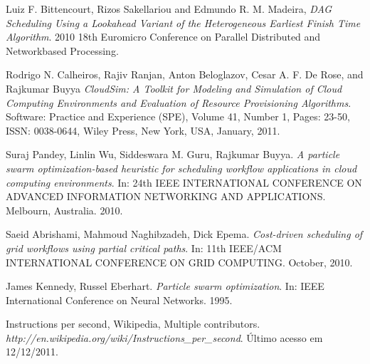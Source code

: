 \documentclass[a4paper,10pt]{article}
\begin{document}
\begin{thebibliography}{9}

  Luiz F. Bittencourt, Rizos Sakellariou and Edmundo R. M. Madeira,
  \emph{DAG Scheduling Using a Lookahead Variant
of the Heterogeneous Earliest Finish Time Algorithm}.
  2010 18th Euromicro Conference on Parallel Distributed and Networkbased Processing.

  Rodrigo N. Calheiros, Rajiv Ranjan, Anton Beloglazov, Cesar A. F. De Rose, and Rajkumar Buyya
  \emph{CloudSim: A Toolkit for Modeling and Simulation of Cloud Computing Environments and Evaluation of Resource Provisioning Algorithms}.
  Software: Practice and Experience (SPE),
  Volume 41, Number 1, Pages: 23-50, ISSN: 0038-0644,
  Wiley Press, New York, USA, January, 2011.

  Suraj Pandey, Linlin Wu, Siddeswara M. Guru, Rajkumar Buyya.
  \emph{A particle swarm    optimization-based heuristic for scheduling workflow applications in cloud computing environments}. 
  In: 24th IEEE INTERNATIONAL CONFERENCE ON ADVANCED INFORMATION NETWORKING AND APPLICATIONS. Melbourn, Australia. 2010.               

  Saeid Abrishami, Mahmoud Naghibzadeh, Dick Epema. 
  \emph{Cost-driven scheduling of grid workflows using partial critical paths}. 
  In: 11th IEEE/ACM INTERNATIONAL CONFERENCE ON GRID COMPUTING. October, 2010.
                                                    

   James Kennedy, Russel Eberhart. 
   \emph{Particle swarm optimization}. 
   In: IEEE International Conference on Neural Networks. 1995.

   Instructions per second, Wikipedia, Multiple contributors.
   \emph{http://en.wikipedia.org/wiki/Instructions\_per\_second}. 
   Último acesso em 12/12/2011.

\end{thebibliography}
\end{document}

